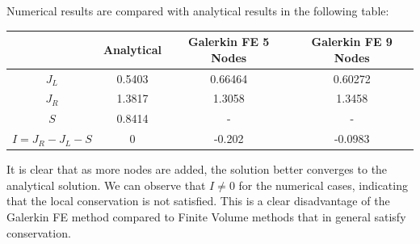 \documentclass[11pt]{article}
\begin{document}
Numerical results are compared with analytical results in the following table:\\

\begin{center}
\begin{tabular}{|c|c|c|c|}
\hline
 & \textbf{Analytical} & \textbf{Galerkin FE 5 Nodes} & \textbf{Galerkin FE 9 Nodes}\\
\hline
$J_{L}$ & 0.5403 & 0.66464 & 0.60272\\
$J_{R}$ & 1.3817 & 1.3058 & 1.3458\\
$S$ & 0.8414 & - & -\\
$I= J_{R}-J_{L}-S$ & 0 & -0.202 & -0.0983\\
\hline
\end{tabular}
\end{center}
It is clear that as more nodes are added, the solution better converges to the analytical solution.
We can observe that $I \neq 0$ for the numerical cases, indicating that the local conservation is not satisfied.    
This is a clear  disadvantage of the Galerkin FE method compared to Finite Volume methods that in general satisfy conservation.

\newpage
\end{document}
